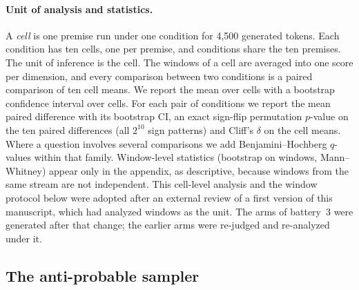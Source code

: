 \paragraph{Unit of analysis and statistics.} A \emph{cell} is one premise
run under one condition for 4,500 generated tokens. Each condition has ten
cells, one per premise, and conditions share the ten premises. The unit of
inference is the cell. The windows of a cell are averaged into one score per
dimension, and every comparison between two conditions is a paired
comparison of ten cell means. We report the mean over cells with a bootstrap
confidence interval over cells. For each pair of conditions we report the
mean paired difference with its bootstrap CI, an exact sign-flip permutation
$p$-value on the ten paired differences (all $2^{10}$ sign patterns) and
Cliff's $\delta$ on the cell means. Where a question involves several
comparisons we add Benjamini--Hochberg $q$-values within that family.
Window-level statistics (bootstrap on windows, Mann--Whitney) appear only in
the appendix, as descriptive, because windows from the same stream are not
independent. This cell-level analysis and the window protocol below were
adopted after an external review of a first version of this manuscript,
which had analyzed windows as the unit. The arms of battery~3 were generated
after that change; the earlier arms were re-judged and re-analyzed under it.

\subsection{The anti-probable sampler}
\label{sec:sampler-method}


